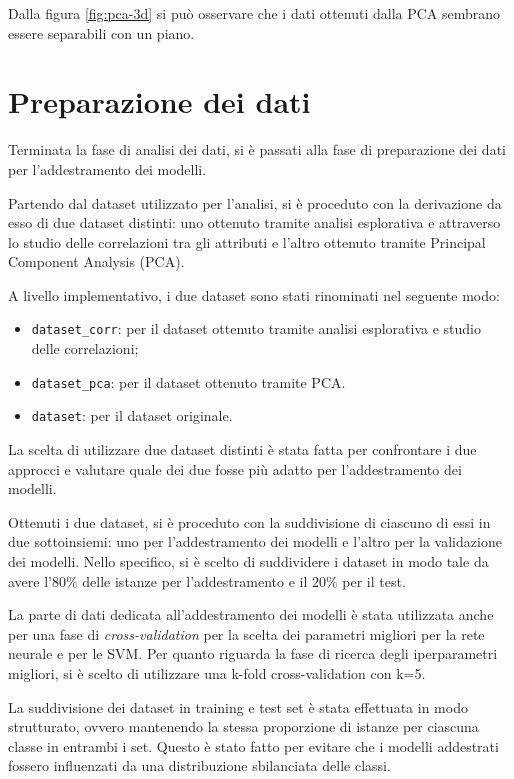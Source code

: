 Dalla figura \ref{fig:pca-3d} si può osservare che i dati ottenuti dalla PCA
sembrano essere separabili con un piano.
\section{Preparazione dei dati} \label{sec:preparazione_dei_dati}
Terminata la fase di analisi dei dati, si è passati alla fase di preparazione
dei dati per l'addestramento dei modelli.

Partendo dal dataset utilizzato per l'analisi, si è proceduto con la derivazione
da esso di due dataset distinti: uno ottenuto tramite analisi esplorativa e
attraverso lo studio delle correlazioni tra gli attributi e l'altro ottenuto
tramite Principal Component Analysis (PCA).

A livello implementativo, i due dataset sono stati rinominati nel seguente modo:
\begin{itemize}
    \item \texttt{dataset\_corr}: per il dataset ottenuto tramite analisi
          esplorativa e studio delle correlazioni;
    \item \texttt{dataset\_pca}: per il dataset ottenuto tramite PCA.
    \item \texttt{dataset}: per il dataset originale.
\end{itemize}

La scelta di utilizzare due dataset distinti è stata fatta per confrontare
i due approcci e valutare quale dei due fosse più adatto per l'addestramento
dei modelli.

Ottenuti i due dataset, si è proceduto con la suddivisione di ciascuno di essi
in due sottoinsiemi: uno per l'addestramento dei modelli e l'altro per la
validazione dei modelli. Nello specifico, si è scelto di suddividere i dataset
in modo tale da avere l'$80\%$ delle istanze per l'addestramento e il $20\%$ per
il test.

La parte di dati dedicata all'addestramento dei modelli è stata utilizzata anche
per una fase di \textit{cross-validation} per la scelta dei parametri migliori
per la rete neurale e per le SVM. Per quanto riguarda la fase di ricerca degli
iperparametri migliori, si è scelto di utilizzare una k-fold cross-validation
con k=5.

La suddivisione dei dataset in training e test set è stata effettuata in modo
strutturato, ovvero mantenendo la stessa proporzione di istanze per ciascuna
classe in entrambi i set. Questo è stato fatto per evitare che i modelli
addestrati fossero influenzati da una distribuzione sbilanciata delle classi.

